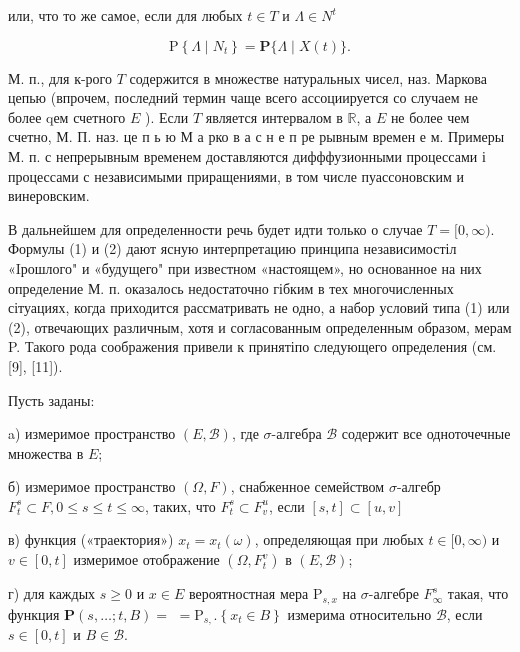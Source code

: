 \documentclass[10pt]{article}
\begin{document}
или, что то же самое, если для любых $t \in T$ и $\Lambda \in N^{t}$



\[

\mathrm{P}\left\{\Lambda \mid N_{t}\right\}=\mathbf{P}\{\Lambda \mid X(t)\} .

\]



М. п., для к-рого $T$ содержится в множестве натуральных чисел, наз. Маркова цепью (впрочем, последний термин чаще всего ассоциируется со случаем не более qем счетного $E$ ). Если $T$ является интервалом в $\mathbb{R}$, а $E$ не более чем счетно, М. П. наз. це п ь ю М а рко в а с н е п ре рывным времен е м. Примеры М. п. с непрерывным временем доставляются дифффузионными процессами і процессами с независимыми приращениями, в том числе пуассоновским и винеровским.



В дальнейшем для определенности речь будет идти только о случае $T=[0, \infty)$. Формулы (1) и (2) дают ясную интерпретацию принципа независимостіл «Iрошлого" и «будущего" при известном «настоящем», но основанное на них определение М. п. оказалось недостаточно гібким в тех многочисленных сітуациях, когда приходится рассматривать не одно, а набор условий типа (1) или (2), отвечающих различным, хотя и согласованным определенным образом, мерам P. Такого рода соображения привели к принятіпо следующего определения (см. [9], [11]).



Пусть заданы:



a) измеримое пространство $(E, \mathscr{B})$, где $\sigma$-алгебра $\mathscr{B}$ содержит все одноточечные множества в $E$;



б) измеримое пространство $(\Omega, F)$, снабженное семейством $\sigma$-алгебр $F_{t}^{s} \subset F, 0 \leqslant s \leqslant t \leqslant \infty$, таких, что $F_{t}^{s} \subset F_{v}^{u}$, если $[s, t] \subset[u, v]$



в) функция («траектория») $x_{t}=x_{t}(\omega)$, определяющая при любых $t \in[0, \infty)$ и $v \in[0, t]$ измеримое отображение $\left(\Omega, F_{t}^{v}\right)$ в $(E, \mathscr{B})$;



г) для каждых $s \geqslant 0$ и $x \in E$ вероятностная мера $\mathrm{P}_{s, x}$ на $\sigma$-алгебре $F_{\infty}^{s}$ такая, что функция $\boldsymbol{P}(s, \ldots ; t, B)=$ $=\mathrm{P}_{s,} .\left\{x_{t} \in B\right\}$ измерима относительно $\mathscr{B}$, если $s \in[0, t]$ и $B \in \mathscr{B}$.
\end{document}
